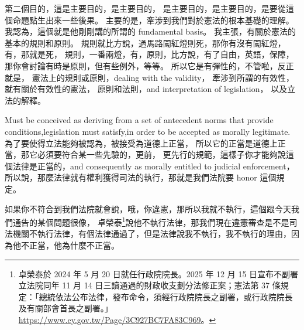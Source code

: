 \hypertarget{w02:cue:43}{}第二個目的，這是主要目的，是主要目的，
\hypertarget{w02:cue:44}{}是主要目的，是主要目的，是要從這個命題點生出來一些後果。
\hypertarget{w02:cue:45}{}主要的是，牽涉到我們對於憲法的根本基礎的理解。
\hypertarget{w02:cue:46}{}我認為，這個就是他剛剛講的所謂的 fundamental basis。
\hypertarget{w02:cue:47}{}我主張，有關於憲法的基本的規則和原則。
\hypertarget{w02:cue:48}{}規則就比方說，過馬路闖紅燈則死，那你有沒有闖紅燈，有，那就是死，
\hypertarget{w02:cue:49}{}規則，一番兩燈，有，原則，比方說，有了自由，英語，保障，
\hypertarget{w02:cue:50}{}那你會討論有時是原則，但有些例外，等等。
\hypertarget{w02:cue:51}{}所以它是有彈性的，不管啦，反正就是，
\hypertarget{w02:cue:52}{}憲法上的規則或原則，dealing with the validity，
\hypertarget{w02:cue:53}{}牽涉到所謂的有效性，就有關於有效性的憲法，
\hypertarget{w02:cue:54}{}原則和法則，and interpretation of legislation，
\hypertarget{w02:cue:55}{}以及立法的解釋。

\hypertarget{w02:cue:56}{}Must be conceived as deriving from a set of antecedent norms
\hypertarget{w02:cue:57}{}that provide conditions,legislation must satisfy,in order to be accepted as morally legitimate.
\hypertarget{w02:cue:58}{}為了要使得立法能夠被認為，被接受為道德上正當，
\hypertarget{w02:cue:59}{}所以它的正當是道德上正當，那它必須要符合某一些先驗的，更前，
\hypertarget{w02:cue:60}{}更先行的規範，這樣子你才能夠說這個法律是正當的，and consequently
\hypertarget{w02:cue:61}{}as morally entitled to judicial enforcement，
\hypertarget{w02:cue:62}{}所以說，那麼法律就有權利獲得司法的執行，那就是我們法院要 honor 這個規定。

\hypertarget{w02:cue:63}{}如果你不符合到我們法院就會說，哦，你違憲，那所以我就不執行，這個跟今天我們通告的某個問題很像，
\hypertarget{w02:cue:64}{}卓榮泰\footnote{卓榮泰於 2024 年 5 月 20 日就任行政院院長。2025 年 12 月 15 日宣布不副署立法院同年 11 月 14 日三讀通過的財政收支劃分法修正案；憲法第 37 條規定：「總統依法公布法律，發布命令，須經行政院院長之副署，或行政院院長及有關部會首長之副署。」\url{https://www.ey.gov.tw/Page/3C927BC7FA83C969}。}說他不執行法律，那我們現在違憲審查是不是司法機關不執行法律，有個法律通過了，但是法律說我不執行，我不執行的理由，因為他不正當，他為什麼不正當。

